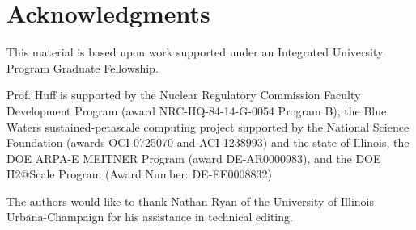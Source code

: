 \section{Acknowledgments}
This material is based upon work supported under an Integrated University Program Graduate
Fellowship.

Prof. Huff is supported by the Nuclear Regulatory Commission Faculty Development
Program (award NRC-HQ-84-14-G-0054 Program B), the Blue Waters 
sustained-petascale computing project supported by the National Science 
Foundation (awards OCI-0725070 and ACI-1238993) and the state of Illinois, 
the DOE ARPA-E MEITNER Program (award DE-AR0000983), and the DOE H2@Scale 
Program (Award Number: DE-EE0008832)

The authors would like to thank Nathan Ryan of the University of Illinois 
Urbana-Champaign for his assistance in technical editing.